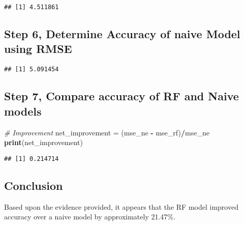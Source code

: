 \documentclass[]{article}
\newenvironment{Shaded}{\begin{snugshade}}{\end{snugshade}}
\newcommand{\KeywordTok}[1]{\textcolor[rgb]{0.13,0.29,0.53}{\textbf{#1}}}
\newcommand{\DecValTok}[1]{\textcolor[rgb]{0.00,0.00,0.81}{#1}}
\newcommand{\StringTok}[1]{\textcolor[rgb]{0.31,0.60,0.02}{#1}}
\newcommand{\CommentTok}[1]{\textcolor[rgb]{0.56,0.35,0.01}{\textit{#1}}}
\newcommand{\OperatorTok}[1]{\textcolor[rgb]{0.81,0.36,0.00}{\textbf{#1}}}
\newcommand{\NormalTok}[1]{#1}
\begin{document}
\begin{verbatim}
## [1] 4.511861
\end{verbatim}

\subsection{Step 6, Determine Accuracy of naive Model using
RMSE}\label{step-6-determine-accuracy-of-naive-model-using-rmse}

\begin{Shaded}
\end{Shaded}

\begin{verbatim}
## [1] 5.091454
\end{verbatim}

\subsection{Step 7, Compare accuracy of RF and Naive
models}\label{step-7-compare-accuracy-of-rf-and-naive-models}

\begin{Shaded}
\begin{Highlighting}[]
\CommentTok{# Improvement }
\NormalTok{net_improvement =}\StringTok{ }\NormalTok{(mse_ne }\OperatorTok{-}\StringTok{ }\NormalTok{mse_rf)}\OperatorTok{/}\NormalTok{mse_ne}
\KeywordTok{print}\NormalTok{(net_improvement)}
\end{Highlighting}
\end{Shaded}

\begin{verbatim}
## [1] 0.214714
\end{verbatim}

\subsection{Conclusion}\label{conclusion}

Based upon the evidence provided, it appears that the RF model improved
accuracy over a naive model by approximately 21.47\%.
\end{document}
